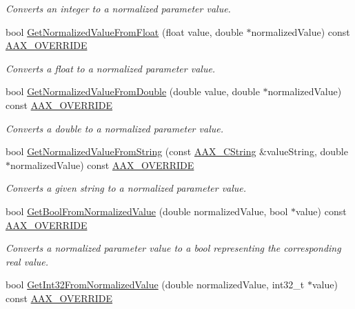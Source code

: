 \begin{Indent}
\begin{DoxyCompactItemize}
\begin{DoxyCompactList}\small\item\em Converts an integer to a normalized parameter value. \end{DoxyCompactList}\item 
bool \mbox{\hyperlink{a01537_a43566eca44cfeb2d17f7f0a032438711}{Get\+Normalized\+Value\+From\+Float}} (float value, double $\ast$normalized\+Value) const \mbox{\hyperlink{a00392_ac2f24a5172689ae684344abdcce55463}{A\+A\+X\+\_\+\+O\+V\+E\+R\+R\+I\+DE}}
\begin{DoxyCompactList}\small\item\em Converts a float to a normalized parameter value. \end{DoxyCompactList}\item 
bool \mbox{\hyperlink{a01537_a7e19b865b0aac3b5097f7a4d31596090}{Get\+Normalized\+Value\+From\+Double}} (double value, double $\ast$normalized\+Value) const \mbox{\hyperlink{a00392_ac2f24a5172689ae684344abdcce55463}{A\+A\+X\+\_\+\+O\+V\+E\+R\+R\+I\+DE}}
\begin{DoxyCompactList}\small\item\em Converts a double to a normalized parameter value. \end{DoxyCompactList}\item 
bool \mbox{\hyperlink{a01537_aeec2d481aa68aefbe4675f0a381c28fd}{Get\+Normalized\+Value\+From\+String}} (const \mbox{\hyperlink{a01573}{A\+A\+X\+\_\+\+C\+String}} \&value\+String, double $\ast$normalized\+Value) const \mbox{\hyperlink{a00392_ac2f24a5172689ae684344abdcce55463}{A\+A\+X\+\_\+\+O\+V\+E\+R\+R\+I\+DE}}
\begin{DoxyCompactList}\small\item\em Converts a given string to a normalized parameter value. \end{DoxyCompactList}\item 
bool \mbox{\hyperlink{a01537_a08a9421ee1cb94cae62df623d0a4cc37}{Get\+Bool\+From\+Normalized\+Value}} (double normalized\+Value, bool $\ast$value) const \mbox{\hyperlink{a00392_ac2f24a5172689ae684344abdcce55463}{A\+A\+X\+\_\+\+O\+V\+E\+R\+R\+I\+DE}}
\begin{DoxyCompactList}\small\item\em Converts a normalized parameter value to a bool representing the corresponding real value. \end{DoxyCompactList}\item 
bool \mbox{\hyperlink{a01537_aab27c2807ac108ebaa114f599eacba5f}{Get\+Int32\+From\+Normalized\+Value}} (double normalized\+Value, int32\+\_\+t $\ast$value) const \mbox{\hyperlink{a00392_ac2f24a5172689ae684344abdcce55463}{A\+A\+X\+\_\+\+O\+V\+E\+R\+R\+I\+DE}}

\end{DoxyCompactItemize}
\end{Indent}
